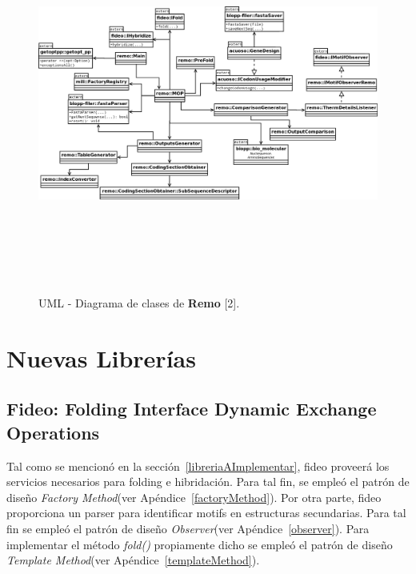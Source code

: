 \begin{figure}[!hbtp]
	\begin{center}
		\hspace*{-1.5cm}\includegraphics[width=19cm, height=12.5cm, angle=90]{image/emptyClass.png}
		\caption{UML - Diagrama de clases de \textbf{Remo} [2].}
		\label{RemoDClase1}
	\end{center}
\end{figure}

\vskip 15cm
\section{Nuevas Librerías}
\subsection{Fideo: Folding Interface Dynamic Exchange Operations}

\par Tal como se mencionó en la sección~\ref{libreriaAImplementar}, fideo proveerá los servicios necesarios para folding e hibridación. Para tal fin, se empleó el patrón de diseño \emph{Factory Method}(ver Apéndice~\ref{factoryMethod}). Por otra parte, fideo proporciona un parser para identificar motifs en estructuras secundarias. Para tal fin se empleó el patrón de diseño \emph{Observer}(ver Apéndice~\ref{observer}). Para implementar el método \emph{fold()} propiamente dicho se empleó el patrón de diseño \emph{Template Method}(ver Apéndice~\ref{templateMethod}).

